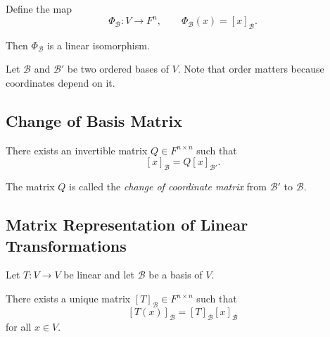 \documentclass[12pt]{article}
\theoremstyle{remark}
\theoremstyle{definition}
\begin{document}
Define the map
\[
\Phi_{\mathcal{B}} : V \to F^n,
\qquad
\Phi_{\mathcal{B}}(x) = [x]_{\mathcal{B}}.
\]

Then $\Phi_{\mathcal{B}}$ is a linear isomorphism.

\begin{center}
\end{center}

Let $\mathcal{B}$ and $\mathcal{B}'$ be two ordered bases of $V$. Note that order matters because coordinates depend on it.



\subsection*{Change of Basis Matrix}

There exists an invertible matrix $Q \in F^{n \times n}$ such that
\[
[x]_{\mathcal{B}} = Q [x]_{\mathcal{B}'}.
\]

The matrix $Q$ is called the \emph{change of coordinate matrix}
from $\mathcal{B}'$ to $\mathcal{B}$.

\begin{center}
\end{center}

\subsection*{Matrix Representation of Linear Transformations}

Let $T: V \to V$ be linear and let $\mathcal{B}$ be a basis of $V$.

There exists a unique matrix $[T]_{\mathcal{B}} \in F^{n \times n}$ such that
\[
[T(x)]_{\mathcal{B}} = [T]_{\mathcal{B}} [x]_{\mathcal{B}}
\]
for all $x \in V$.

\begin{center}
\end{center}
\end{document}

